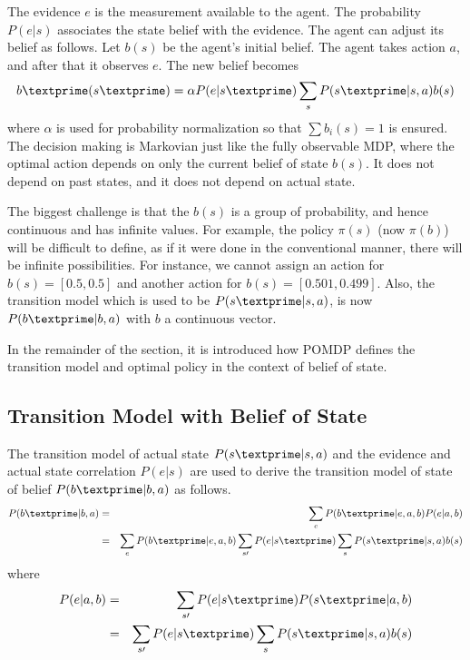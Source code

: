 The evidence $e$ is the measurement available to the agent. The probability $P(e|s)$ associates the state belief with the evidence. The agent can adjust its belief as follows. Let $b(s)$ be the agent's initial belief. The agent takes action $a$, and after that it observes $e$. The new belief becomes
\begin{eqnarray}
	b\textprime(s\textprime) = \alpha P(e|s\textprime) \sum_{s} P(s\textprime|s,a)b(s) \nonumber
\end{eqnarray}
where $\alpha$ is used for probability normalization so that $\sum b_i(s) = 1$ is ensured. The decision making is Markovian just like the fully observable MDP, where the optimal action depends on only the current belief of state $b(s)$. It does not depend on past states, and it does not depend on actual state.

The biggest challenge is that the $b(s)$ is a group of probability, and hence continuous and has infinite values. For example, the policy $\pi(s)$ (now $\pi(b)$) will be difficult to define, as if it were done in the conventional manner, there will be infinite possibilities. For instance, we cannot assign an action for $b(s) = [0.5,0.5]$ and another action for $b(s) = [0.501, 0.499]$. Also, the transition model which is used to be $P(s\textprime|s,a)$, is now $P(b\textprime|b,a)$ with $b$ a continuous vector.

In the remainder of the section, it is introduced how POMDP defines the transition model and optimal policy in the context of belief of state.

\subsection{Transition Model with Belief of State}

The transition model of actual state $P(s\textprime|s,a)$ and the evidence and actual state correlation $P(e|s)$ are used to derive the transition model of state of belief $P(b\textprime|b,a)$ as follows.
\begin{eqnarray}
	P(b\textprime|b,a) &=& \sum_{e}P(b\textprime|e,a,b)P(e|a,b) \nonumber \\
	&=& \sum_{e}P(b\textprime|e,a,b)\sum_{s\prime}P(e|s\textprime) \sum_{s}P(s\textprime|s,a)b(s) \nonumber
\end{eqnarray}
where
\begin{eqnarray}
	P(e|a,b) &=& \sum_{s\prime}P(e|s\textprime)P(s\textprime|a,b) \nonumber \\
	&=& \sum_{s\prime}P(e|s\textprime) \sum_{s}P(s\textprime|s,a)b(s) \nonumber
\end{eqnarray}

